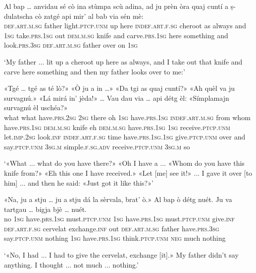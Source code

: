 \begin{linenumbers}
	\gll  Al bap … anvidau sé cò ina stùmpa scù adina, ad ju prèn òra quaj cuntí a ṣ-dulatscha cò zatgé api mir’ al bab via sén mè:\\
	\textsc{def.art.m.sg} father {} light.\textsc{ptcp.unm} up here \textsc{indef.art.f.sg} cheroot as always and \textsc{1sg} take.\textsc{prs.1sg} out \textsc{dem.m.sg} knife and carve.\textsc{prs.1sg} here something and look.\textsc{prs.3sg} \textsc{def.art.m.sg} father over on \textsc{1sg} \\
\end{linenumbers}
\medskip
\glt `My father ... lit up a cheroot up here as always, and I take out that knife and carve here something and then my father looks over to me:'
\medskip

\begin{linenumbers}
	\gll  «Tgé … tgé as té lò?» «Ò ju a in …» «Da tgi as quaj cuntí?» «Ah quèl va ju survagnú.» «Lá mirá in' jèda!» … Vau dau via … api détg èl: «Símplamajn survagnú èl uschéa?» \\
	what {} what have.\textsc{prs.2sg} \textsc{2sg} there oh \textsc{1sg} have.\textsc{prs.1sg} \textsc{indef.art.m.sg} {} from whom have.\textsc{prs.1sg} \textsc{dem.m.sg} knife eh \textsc{dem.m.sg} have.\textsc{prs.1sg} \textsc{1sg} receive.\textsc{ptcp.unm} let.\textsc{imp.2sg} look.\textsc{inf} \textsc{indef.art.f.sg} time {} have.\textsc{prs.1sg.1sg} give.\textsc{ptcp.unm} over {} and say.\textsc{ptcp.unm} \textsc{3sg.m} simple.\textsc{f.sg.adv} receive.\textsc{ptcp.unm} \textsc{3sg.m} so  \\
\end{linenumbers}
\medskip
\glt `«What ... what do you have there?» «Oh I have a ... «Whom do you have this knife from?» «Eh this one I have received.» «Let [me] see it!» ... I gave it over [to him] ... and then he said: «Just got it like this?»'
\medskip

\begin{linenumbers}
	\gll «Na, ju a stju … ju a stju dá la sèrvala, brat’ ò.» Al bap ò détg nuét. Ju va tartgau … bigja bjè … nuét.\\
	no \textsc{1sg} have.p\textsc{rs.1sg} must.\textsc{ptcp.unm} {} \textsc{1sg} have.\textsc{prs.1sg} must.\textsc{ptcp.unm} give.\textsc{inf} \textsc{def.art.f.sg} cervelat exchange.\textsc{inf} out \textsc{def.art.m.sg} father have.\textsc{prs.3sg} say.\textsc{ptcp.unm} nothing \textsc{1sg} have.\textsc{prs.1sg} think.\textsc{ptcp.unm} {} \textsc{neg} much {} nothing\\
\end{linenumbers}
\medskip
\glt `«No, I had ... I had to give the cervelat, exchange [it].» My father didn't say anything. I thought ... not much ... nothing.'
\medskip

